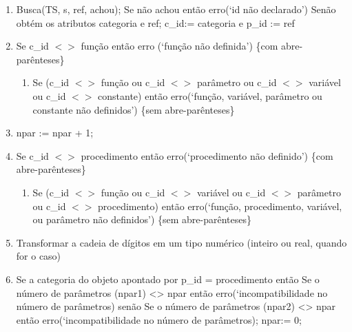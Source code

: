 \documentclass[a4paper,12pt]{article}
\begin{document}
\begin{enumerate}
	\item  Busca(TS, s, ref, achou);
Se não achou então erro(‘id não declarado’)
Senão obtém os atributos categoria e ref; c\_id:= categoria e p\_id := ref

	\item Se c\_id $<>$ função então erro (‘função não definida’) \{com abre-parênteses\}
    \begin{enumerate}
    \item  Se (c\_id $<>$ função ou c\_id $<>$ parâmetro ou c\_id $<>$ variável ou c\_id $<>$ constante) então erro(‘função, 			variável, parâmetro ou constante não definidos’) \{sem abre-parênteses\}
    \end{enumerate}
    
    \item  npar := npar + 1;
    
    \item Se c\_id $<>$ procedimento então erro(‘procedimento não definido’) \{com abre-parênteses\}
    
    \begin{enumerate}
    \item Se (c\_id $<>$ função ou c\_id $<>$ variável ou c\_id $<>$ parâmetro ou c\_id $<>$ procedimento) então
erro(‘função, procedimento, variável, ou parâmetro não definidos’) \{sem abre-parênteses\}
    \end{enumerate}
    
    \item Transformar a cadeia de dígitos em um tipo numérico (inteiro ou real, quando for o caso)
    
    \item Se a categoria do objeto apontado por p_id = procedimento
 então Se o número de parâmetros (npar1) <> npar então erro(‘incompatibilidade no número de parâmetros)
 senão Se o número de parâmetros (npar2) <> npar então erro(‘incompatibilidade no número de parâmetros);
npar:= 0;
    \end{enumerate}
    
\end{document}
